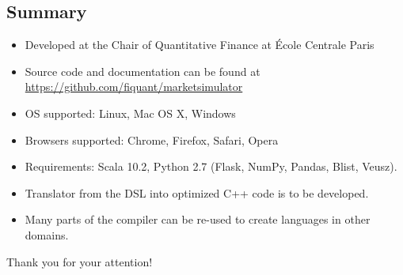 \documentclass{beamer}
\begin{document}
\subsection{Summary}
\begin{frame}
\begin{itemize}
\item Developed at the Chair of Quantitative Finance at \'{E}cole Centrale Paris
\item Source code and documentation can be found at   \textcolor[rgb]{0.00,0.50,0.75}{\href{https://github.com/fiquant/marketsimulator}{https://github.com/fiquant/marketsimulator}}
\item OS supported: Linux, Mac OS X, Windows
\item Browsers supported: Chrome, Firefox, Safari, Opera
\item Requirements: Scala 10.2, Python 2.7 (Flask, NumPy, Pandas, Blist, Veusz).
\item Translator from the DSL into optimized C++ code is to be developed.
\item Many parts of the compiler can be re-used to create languages in other domains.
\end{itemize}

\end{frame}

\begin{frame}
\Huge{\centerline{Thank you for your attention!}}
\end{frame}

\end{document}
